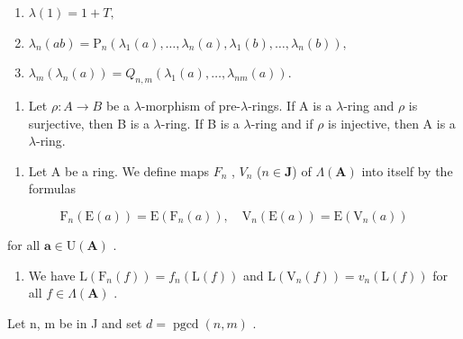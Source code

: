 \begin{enumerate}
\def\labelenumi{(\roman{enumi})}
\item
  \(\lambda(1) = 1 + T,\)
\item
  \(\lambda_{n}(ab) = \mathrm{P}_{n}(\lambda_{1}(a),\dots,\lambda_{n}(a),\lambda_{1}(b),\dots,\lambda_{n}(b)),\)
\item
  \(\lambda_{m}(\lambda_{n}(a)) = Q_{n,m}(\lambda_{1}(a),\dots,\lambda_{nm}(a)).\)
\end{enumerate}

\begin{enumerate}
\def\labelenumi{\alph{enumi})}
\setcounter{enumi}{5}
\tightlist
\item
  Let \(\rho: A \to B\) be a \(\lambda\)-morphism of pre-\(\lambda\)-rings. If A is a \(\lambda\)-ring and \(\rho\) is surjective, then B is a \(\lambda\)-ring. If B is a \(\lambda\)-ring and if \(\rho\) is injective, then A is a \(\lambda\)-ring.
\end{enumerate}

\begin{enumerate}
\def\labelenumi{\arabic{enumi})}
\setcounter{enumi}{46}
\tightlist
\item
  Let A be a ring. We define maps \(F_{n}\) , \(V_{n}\) (\(n \in \mathbf{J}\)) of \(\Lambda(\mathbf{A})\) into itself by the formulas
\end{enumerate}

\[
\mathrm{F} _ {n} (\mathrm{E} (a)) = \mathrm{E} \left(\mathrm{F} _ {n} (a)\right), \quad \mathrm{V} _ {n} (\mathrm{E} (a)) = \mathrm{E} \left(\mathrm{V} _ {n} (a)\right)
\]

for all \(\boldsymbol{a} \in \mathrm{U}(\mathbf{A})\) .

\begin{enumerate}
\def\labelenumi{\alph{enumi})}
\tightlist
\item
  We have \(\mathrm{L}(\mathrm{F}_n(f)) = f_n(\mathrm{L}(f))\) and \(\mathrm{L}(\mathrm{V}_n(f)) = v_n(\mathrm{L}(f))\) for all \(f \in \Lambda(\mathbf{A})\) .
\end{enumerate}

Let n, m be in J and set \(d = \operatorname{pgcd}(n, m)\) .


